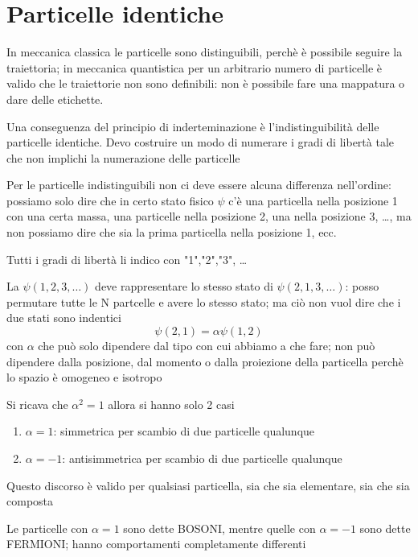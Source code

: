 \chapter{Particelle identiche}

In meccanica classica le particelle sono distinguibili, perchè è possibile seguire la traiettoria; in meccanica quantistica per un arbitrario numero di particelle è valido che le traiettorie non sono definibili: non è possibile fare una mappatura o dare delle etichette.

\noindent Una conseguenza del principio di inderteminazione è l'indistinguibilità delle particelle identiche. 
Devo costruire un modo di numerare i gradi di libertà tale che non implichi la numerazione delle particelle

\noindent Per le particelle indistinguibili non ci deve essere alcuna differenza nell'ordine: possiamo solo dire che in certo stato fisico \(\psi\) c'è una particella nella posizione 1 con una certa massa, una particelle nella posizione 2, una nella posizione 3, \dots, ma non possiamo dire che sia la prima particella nella posizione 1, ecc. 

\noindent Tutti i gradi di libertà li indico con "1","2","3", \dots 

\noindent La \(\psi(1,2,3,\dots)\) deve rappresentare lo stesso stato di \(\psi(2,1,3,\dots)\): posso permutare tutte le N partcelle e avere lo stesso stato; ma ciò non vuol dire che i due stati sono indentici
\begin{equation*}
    \psi(2,1) = \alpha \psi(1,2) \tag{1}
\end{equation*}
con \(\alpha\) che può solo dipendere dal tipo con cui abbiamo a che fare; non può dipendere dalla posizione, dal momento o dalla proiezione della particella perchè lo spazio è omogeneo e isotropo

\noindent Si ricava che \(\alpha^2 = 1\) allora si hanno solo 2 casi

\begin{enumerate}
    \item \(\alpha=1\): simmetrica per scambio di due particelle qualunque
    \item \(\alpha=-1\): antisimmetrica per scambio di due particelle qualunque
\end{enumerate}

\noindent Questo discorso è valido per qualsiasi particella, sia che sia elementare, sia che sia composta

\noindent Le particelle con \(\alpha=1\) sono dette BOSONI, mentre quelle con \(\alpha=-1\) sono dette FERMIONI; hanno comportamenti completamente differenti

